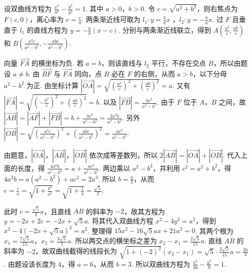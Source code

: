 \begin{solution}
设双曲线方程为
\(
\frac{x^2}{a^2}-\frac{y^2}{b^2}=1
\).
其中 \(a>0\)，\(b>0\). 令 \(c=\sqrt{a^2+b^2}\)，则右焦点为 \(F(c,0)\)，离心率为 \(e=\frac{c}{a}\). 两条渐近线可取为
\(
l_1:y=\frac{b}{a}x
\)
，\(l_2:y=-\frac{b}{a}x.
\)
过 \(F\) 且垂直于 \(l_1\) 的直线方程为
\(
y=-\frac{a}{b}(x-c)
\).
分别与两条渐近线联立，得到 \(A\left(\frac{a^2}{c},\frac{ab}{c}\right)\) 和 \(B\left(\frac{a^2c}{a^2-b^2},-\frac{abc}{a^2-b^2}\right)\).

向量 \(\overrightarrow{FA}\) 的横坐标为负. 若 \(a=b\)，则该直线与 \(l_2\) 平行，不存在交点 \(B\)，所以由题设 \(a\ne b\). 由 \(\overrightarrow{BF}\) 与 \(\overrightarrow{FA}\) 同向，点 \(B\) 必在 \(F\) 的右侧，从而 \(a>b\)，以下分母 \(a^2-b^2\) 为正. 由坐标计算
\(
\left|\overrightarrow{OA}\right|=\sqrt{\left(\frac{a^2}{c}\right)^2+\left(\frac{ab}{c}\right)^2}=a
\).
又有
\(
\left|\overrightarrow{FA}\right|=\sqrt{\left(-\frac{b^2}{c}\right)^2+\left(\frac{ab}{c}\right)^2}=b
\).
以及
\(
\left|\overrightarrow{FB}\right|=\frac{bc^2}{a^2-b^2}
\).
由于 \(F\) 位于 \(A\)，\(B\) 之间，故
\(
\left|\overrightarrow{AB}\right|=\left|\overrightarrow{AF}\right|+\left|\overrightarrow{FB}\right|=b+\frac{bc^2}{a^2-b^2}=\frac{2a^2b}{a^2-b^2}
\).
另外
\(
\left|\overrightarrow{OB}\right|=\sqrt{\left(\frac{a^2c}{a^2-b^2}\right)^2+\left(\frac{abc}{a^2-b^2}\right)^2}=\frac{ac^2}{a^2-b^2}
\).

由题意，\(\left|\overrightarrow{OA}\right|\)，\(\left|\overrightarrow{AB}\right|\)，\(\left|\overrightarrow{OB}\right|\) 依次成等差数列，所以
\(
2\left|\overrightarrow{AB}\right|=\left|\overrightarrow{OA}\right|+\left|\overrightarrow{OB}\right|
\).
代入上面的长度，得
\(
\frac{4a^2b}{a^2-b^2}=a+\frac{ac^2}{a^2-b^2}
\).
两边乘以 \(a^2-b^2\)，并利用 \(c^2=a^2+b^2\)，得
\(
4a^2b=a(a^2-b^2)+ac^2=2a^3
\).
所以 \(b=\frac{a}{2}\)，从而
\(
e=\frac{c}{a}=\sqrt{1+\frac{b^2}{a^2}}=\sqrt{1+\frac{1}{4}}=\frac{\sqrt{5}}{2}
\).

此时 \(c=\frac{\sqrt{5}}{2}a\)，且直线 \(AB\) 的斜率为 \(-2\)，故其方程为
\(
y=-2x+2c=-2x+\sqrt{5}a
\).
将其代入双曲线方程 \(x^2-4y^2=a^2\)，得到
\(
x^2-4\left(-2x+\sqrt{5}a\right)^2=a^2
\).
整理得
\(
15x^2-16\sqrt{5}ax+21a^2=0
\).
其两个根为
\(
x_1=\frac{7\sqrt{5}}{15}a
\)，\(x_2=\frac{3\sqrt{5}}{5}a\).
所以两交点的横坐标之差为
\(
x_2-x_1=\frac{2\sqrt{5}}{15}a
\).
直线 \(AB\) 的斜率为 \(-2\)，故双曲线截得的线段长为
\(
\sqrt{1+(-2)^2}\left(x_2-x_1\right)=\sqrt{5}\cdot\frac{2\sqrt{5}}{15}a=\frac{2a}{3}
\).
由题设该长度为 \(4\)，得 \(a=6\)，从而 \(b=3\). 所以双曲线方程为
\(
\frac{x^2}{36}-\frac{y^2}{9}=1
\).
\end{solution}

